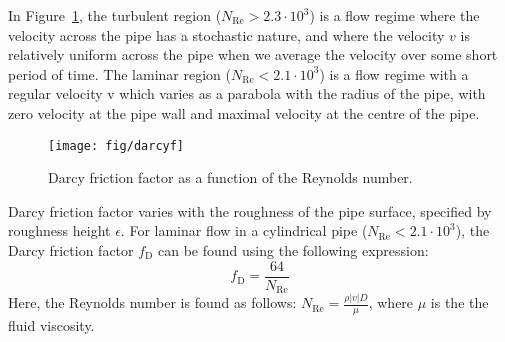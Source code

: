 \documentclass[%
]{USN-PhD}
\begin{document}
In Figure~\ref{fig:fig2}, the turbulent region ($N_\mathrm{Re} > 2.3\cdot10^3$) is a flow regime where the velocity across the pipe has a stochastic nature, and where the velocity $v$ is relatively uniform across the pipe when we average the velocity over some short period of time. The laminar region ($N_\mathrm{Re} < 2.1\cdot10^3$) is a flow regime with a regular velocity v which varies as a parabola with the radius of the pipe, with zero velocity at the pipe wall and maximal velocity at the centre of the pipe.
\begin{figure}[!ht]
  \centering
 \texttt{[image: fig/darcyf]}
 \caption{Darcy friction factor as a function of the Reynolds number.}
  \label{fig:fig2}
\end{figure}

Darcy friction factor varies with the roughness of the pipe surface, specified by roughness height $\epsilon$. For laminar flow in a cylindrical pipe ($N_\mathrm{Re} < 2.1\cdot10^3$), the Darcy friction factor $f_\mathrm{D}$ can be found using the following expression:
\begin{equation}\label{eq:eq2}
f_\mathrm{D}=\frac{64}{N_\mathrm{Re}}
\end{equation}
Here, the Reynolds number is found as follows: $N_\mathrm{Re}=\frac{\rho|v|D}{\mu}$, where $\mu$ is the the fluid viscosity.
\end{document}
